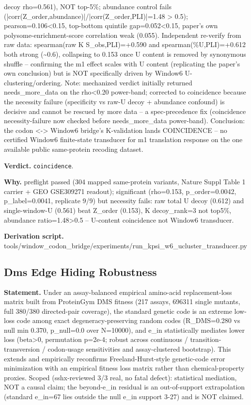 decoy rho=0.561), NOT top-5\%; abundance control fails
(|corr(Z\_order,abundance)|/|corr(Z\_order,PLI)|=1.48 > 0.5); pearson=0.106<0.15, top-bottom
quintile gap=0.052<0.15, paper's own polysome-enrichment-score correlation weak (0.055). Independent
re-verify from raw data: spearman(raw K S\_obs,PLI)=+0.590 and spearman(\%U,PLI)=+0.612 both strong
(\textasciitilde{}0.6), collapsing to 0.153 once U content is removed by synonymous shuffle --
confirming the m1 effect scales with U content (replicating the paper's own conclusion) but is NOT
specifically driven by Window6 U-clustering/ordering. Note: mechanized verdict initially returned
needs\_more\_data on the rho<0.20 power-band; corrected to coincidence because the necessity failure
(specificity vs raw-U decoy + abundance confound) is decisive and cannot be rescued by more data --
a spec-precedence fix (coincidence necessity-failure now checked before needs\_more\_data
power-band). Conclusion: the codon <-> Window6 bridge's K-validation lands COINCIDENCE -- no
certified Window6 finite-state transducer for m1 translation response on the one available public
same-protein recoding dataset.

\textbf{Verdict.} \texttt{coincidence}.

\textbf{Why.} preflight passed (304 mapped same-protein variants, Nature Suppl Table 1 carrier + GEO GSE309271
readout); significant (rho=0.153, p\_order=0.0042, p\_label=0.0041, replicate 9/9) but necessity
fails: raw total U decoy (0.612) and single-window-U (0.561) beat Z\_order (0.153), K decoy\_rank=3
not top5\%, abundance ratio=1.48>0.5 -- U-content coincidence not Window6 transducer.

\textbf{Derivation script.} tools/window\_codon\_bridge/experiments/run\_kpsi\_w6\_ucluster\_transducer.py

\subsection{Dms Edge Hiding Robustness}\label{sec:bridge-dms-edge-hiding-robustness}
\textbf{Statement.} Under an assay-balanced empirical amino-acid replacement-loss matrix built from ProteinGym DMS
fitness (217 assays, 696311 single mutants, full 380/380 directed-pair coverage), the standard
genetic code is an extreme low-loss code among exact degeneracy-preserving random codes
(R\_DMS=0.280 vs null min 0.370, p\_null=0.0 over N=10000), and e\_in statistically mediates lower
loss (beta>0, permutation p=2e-4; robust across continuous / transition-transversion / codon-usage
sensitivities and assay-clustered bootstrap). This extends and empirically reconfirms
Freeland-Hurst-style genetic-code error minimization with an empirical fitness loss matrix rather
than chemical-property proxies. Scoped (sshx-reviewed 3/3 real, no fatal defect): statistical
mediation, NOT a causal claim; the beyond-e\_in residual is an out-of-support extrapolation
(standard e\_in=67 lies outside the null e\_in support 3-27) and is NOT claimed.

